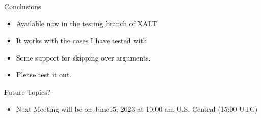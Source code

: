 \documentclass{beamer}
\begin{document}
\begin{frame}{Conclusions}
  \begin{itemize}
    \item Available now in the testing branch of XALT
    \item It works with the cases I have tested with
    \item Some support for skipping over arguments.
    \item Please test it out.
  \end{itemize}
\end{frame}

\begin{frame}{Future Topics?}
  \begin{itemize}
    \item Next Meeting will be on June15, 2023 at 10:00 am
      U.S. Central (15:00 UTC)
  \end{itemize}
\end{frame}

%
\end{document}

